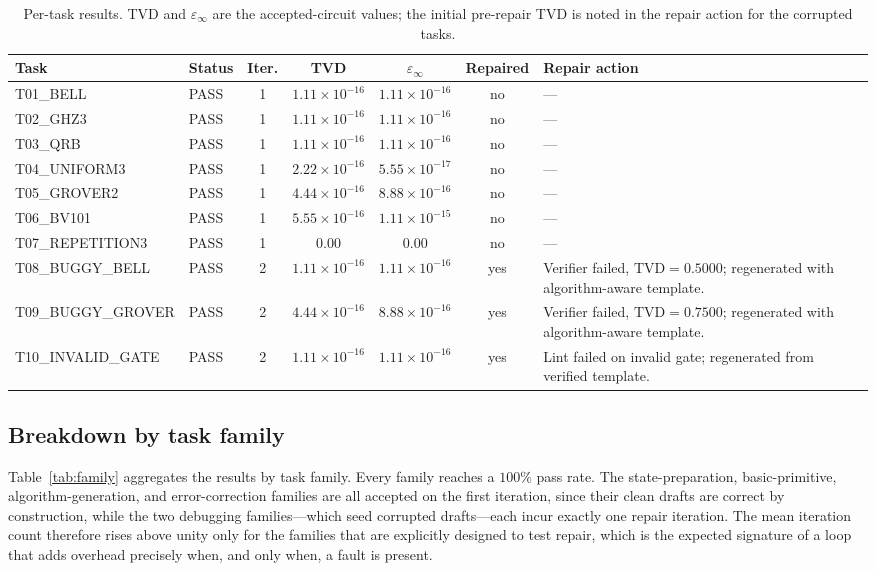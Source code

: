 \documentclass[11pt,a4paper]{article}
\newcounter{algo}
\newcommand{\tvd}{\mathrm{TVD}}
\begin{document}
\begin{table}[H]
\centering
\caption{Per-task results. TVD and $\varepsilon_\infty$ are the accepted-circuit values; the initial pre-repair TVD is noted in the repair action for the corrupted tasks.}
\label{tab:pertask}
\setlength{\tabcolsep}{3.5pt}\scriptsize
\begin{tabular}{@{}p{1.7cm}lccccp{3.8cm}@{}}
\toprule
\textbf{Task} & \textbf{Status} & \textbf{Iter.} & \textbf{TVD} & \textbf{$\varepsilon_\infty$} & \textbf{Repaired} & \textbf{Repair action} \\
\midrule
T01\_\allowbreak BELL        & PASS & 1 & $1.11\!\times\!10^{-16}$ & $1.11\!\times\!10^{-16}$ & no  & --- \\
T02\_\allowbreak GHZ3        & PASS & 1 & $1.11\!\times\!10^{-16}$ & $1.11\!\times\!10^{-16}$ & no  & --- \\
T03\_\allowbreak QRB         & PASS & 1 & $1.11\!\times\!10^{-16}$ & $1.11\!\times\!10^{-16}$ & no  & --- \\
T04\_\allowbreak UNIFORM3    & PASS & 1 & $2.22\!\times\!10^{-16}$ & $5.55\!\times\!10^{-17}$ & no  & --- \\
T05\_\allowbreak GROVER2     & PASS & 1 & $4.44\!\times\!10^{-16}$ & $8.88\!\times\!10^{-16}$ & no  & --- \\
T06\_\allowbreak BV101       & PASS & 1 & $5.55\!\times\!10^{-16}$ & $1.11\!\times\!10^{-15}$ & no  & --- \\
T07\_\allowbreak REPETITION3 & PASS & 1 & $0.00$                   & $0.00$                   & no  & --- \\
T08\_\allowbreak BUGGY\_\allowbreak BELL & PASS & 2 & $1.11\!\times\!10^{-16}$ & $1.11\!\times\!10^{-16}$ & yes & Verifier failed, $\tvd=0.5000$; regenerated with algorithm-aware template. \\
T09\_\allowbreak BUGGY\_\allowbreak GROVER & PASS & 2 & $4.44\!\times\!10^{-16}$ & $8.88\!\times\!10^{-16}$ & yes & Verifier failed, $\tvd=0.7500$; regenerated with algorithm-aware template. \\
T10\_\allowbreak INVALID\_\allowbreak GATE & PASS & 2 & $1.11\!\times\!10^{-16}$ & $1.11\!\times\!10^{-16}$ & yes & Lint failed on invalid gate; regenerated from verified template. \\
\bottomrule
\end{tabular}
\end{table}

\subsection{Breakdown by task family}
Table~\ref{tab:family} aggregates the results by task family. Every family reaches a $100\%$ pass rate. The state-preparation, basic-primitive, algorithm-generation, and error-correction families are all accepted on the first iteration, since their clean drafts are correct by construction, while the two debugging families---which seed corrupted drafts---each incur exactly one repair iteration. The mean iteration count therefore rises above unity only for the families that are explicitly designed to test repair, which is the expected signature of a loop that adds overhead precisely when, and only when, a fault is present.
\end{document}
